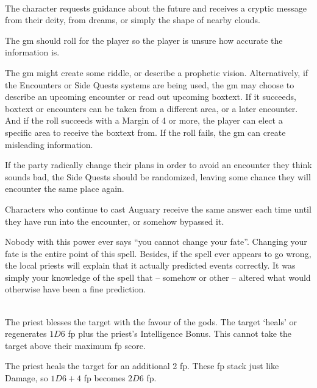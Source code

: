 \begin{multicols}{2}
\spelllevel

\\
The character requests guidance about the future and receives a cryptic message from their deity, from dreams, or simply the shape of nearby clouds.

The \gls{gm} should roll for the player so the player is unsure how accurate the information is.

The \gls{gm} might create some riddle, or describe a prophetic vision.
Alternatively, if the Encounters or Side Quests systems are being used, the \gls{gm} may choose to describe an upcoming encounter or read out upcoming boxtext.\iftoggle{verbose}{\footnote{See pages \pageref{encounters} and \pageref{sidequests} respectively.}}{}
If it succeeds, boxtext or encounters can be taken from a different area, or a later encounter.
And if the roll succeeds with a Margin of 4 or more, the player can elect a specific area to receive the boxtext from.
If the roll fails, the \gls{gm} can create misleading information.

If the party radically change their plans in order to avoid an encounter they think sounds bad, the Side Quests should be randomized, leaving some chance they will encounter the same place again.

Characters who continue to cast Auguary receive the same answer each time until they have run into the encounter, or somehow bypassed it.

Nobody with this power ever says ``you cannot change your fate''.  Changing your fate is the entire point of this spell.  Besides, if the spell ever appears to go wrong, the local priests will explain that it actually predicted events correctly.  It was simply your knowledge of the spell that -- somehow or other -- altered what would otherwise have been a fine prediction.

\\
The priest blesses the target with the favour of the gods. The target `heals' or regenerates $1D6$ \gls{fp} plus the priest's Intelligence Bonus. This cannot take the target above their maximum \gls{fp} score.


The priest heals the target for an additional 2 \gls{fp}.  These \gls{fp} stack just like Damage, so $1D6+4$ \gls{fp} becomes $2D6$ \gls{fp}.

\spelllevel


\end{multicols}
